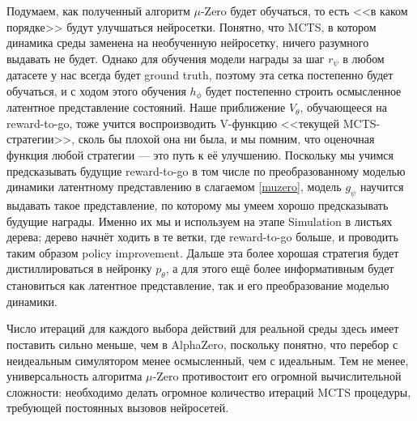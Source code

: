 Подумаем, как полученный алгоритм $\mu$-Zero будет обучаться, то есть <<в каком порядке>> будут улучшаться нейросетки. Понятно, что MCTS, в котором динамика среды заменена на необученную нейросетку, ничего разумного выдавать не будет. Однако для обучения модели награды за шаг $r_{\psi}$ в любом датасете у нас всегда будет ground truth, поэтому эта сетка постепенно будет обучаться, и с ходом этого обучения $h_{\phi}$ будет постепенно строить осмысленное латентное представление состояний. Наше приближение $V_{\theta}$, обучающееся на reward-to-go, тоже учится воспроизводить V-функцию <<текущей MCTS-стратегии>>, сколь бы плохой она ни была, и мы помним, что оценочная функция любой стратегии --- это путь к её улучшению. Поскольку мы учимся предсказывать будущие reward-to-go в том числе по преобразованному моделью динамики латентному представлению в слагаемом \eqref{muzero}, модель $g_{\psi}$ научится выдавать такое представление, по которому мы умеем хорошо предсказывать будущие награды. Именно их мы и используем на этапе Simulation в листьях дерева; дерево начнёт ходить в те ветки, где reward-to-go больше, и проводить таким образом policy improvement. Дальше эта более хорошая стратегия будет дистиллироваться в нейронку $p_{\theta}$, а для этого ещё более информативным будет становиться как латентное представление, так и его преобразование моделью динамики.

\begin{remark}
Число итераций для каждого выбора действий для реальной среды здесь имеет поставить сильно меньше, чем в AlphaZero, поскольку понятно, что перебор с неидеальным симулятором менее осмысленный, чем с идеальным. Тем не менее, универсальность алгоритма $\mu$-Zero противостоит его огромной вычислительной сложности: необходимо делать огромное количество итераций MCTS процедуры, требующей постоянных вызовов нейросетей. 
\end{remark}